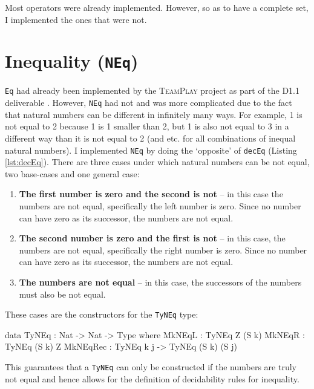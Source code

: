         Most operators were already implemented. However, so as to have a complete set, I implemented the ones that were not.

\section{Inequality (\texttt{NEq})}
    \texttt{Eq} had already been implemented by the \textsc{TeamPlay} project as part of the D1.1 deliverable \cite{teamplay:d1.1}. However, \texttt{NEq} had not and was more complicated due to the fact that natural numbers can be different in infinitely many ways. For example, 1 is not equal to 2 because 1 is 1 smaller than 2, but 1 is also not equal to 3 in a different way than it is not equal to 2 (and etc. for all combinations of inequal natural numbers). I implemented \texttt{NEq} by doing the `opposite' of \texttt{decEq} (Listing \ref{lst:decEq}). There are three cases under which natural numbers can be not equal, two base-cases and one general case:
    \begin{enumerate}
        \item \textbf{The first number is zero and the second is not} -- in this case the numbers are not equal, specifically the left number is zero. Since no number can have zero as its successor, the numbers are not equal.
        \item \textbf{The second number is zero and the first is not} -- in this case, the numbers are not equal, specifically the right number is zero. Since no number can have zero as its successor, the numbers are not equal.
        \item \textbf{The numbers are not equal} -- in this case, the successors of the numbers must also be not equal.
    \end{enumerate}
    These cases are the constructors for the \texttt{TyNEq} type:
    \begin{code}[caption={\texttt{TyNEq}} -- proving inequality.]
        data TyNEq : Nat -> Nat -> Type where
            MkNEqL   : TyNEq Z (S k)
            MkNEqR   : TyNEq (S k) Z
            MkNEqRec : TyNEq k j -> TyNEq (S k) (S j)
    \end{code}
    This guarantees that a \texttt{TyNEq} can only be constructed if the numbers are truly not equal and hence allows for the definition of decidability rules for inequality.

